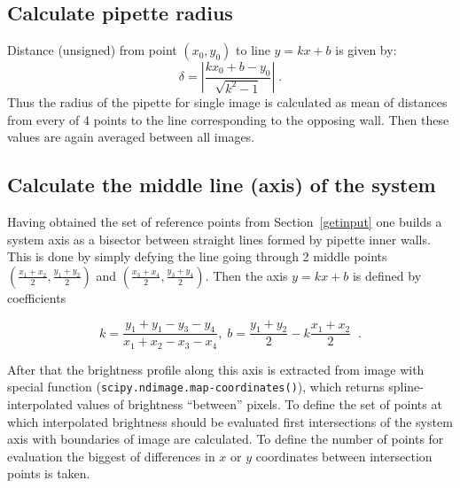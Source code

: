 \subsection{Calculate pipette radius}\label{calcpiprad}

Distance (unsigned) from point $\left(x_0,y_0\right)$ to line $y=kx+b$ is given by:
\begin{equation}
\delta = \left|\frac{kx_0+b-y_0}{\sqrt{k^2-1}}\right|\;.
\label{eq:pointtoline}
\end{equation}
Thus the radius of the pipette for single image is calculated as mean of distances from every of 4 points to the line corresponding to the opposing wall. Then these values are again averaged between all images.

\subsection{Calculate the middle line (axis) of the system}\label{calcaxis}

Having obtained the set of reference points from Section~\ref{getinput} one builds a system axis as a bisector between straight lines formed by pipette inner walls. This is done by simply defying the line going through 2 middle points $\left(\frac{x_1+x_2}{2}, \frac{y_1+y_2}{2}\right)$ and $\left(\frac{x_3+x_4}{2}, \frac{y_3+y_4}{2}\right)$. Then the axis $y = kx+b$ is defined by coefficients

\begin{equation}
k = \frac{y_1+y_1-y_3-y_4}{x_1+x_2-x_3-x_4}, \; b = \frac{y_1+y_2}{2} - k\frac{x_1+x_2}{2}\;\;.
\label{eq:axis}
\end{equation}

After that the brightness profile along this axis is extracted from image with special function (\verb|scipy.ndimage.map-coordinates()|), which returns spline-interpolated values of brightness ``between'' pixels. To define the set of points at which interpolated brightness should be evaluated first intersections of the system axis with boundaries of image are calculated. To define the number of points for evaluation the biggest of differences in $x$ or $y$ coordinates between intersection points is taken.

